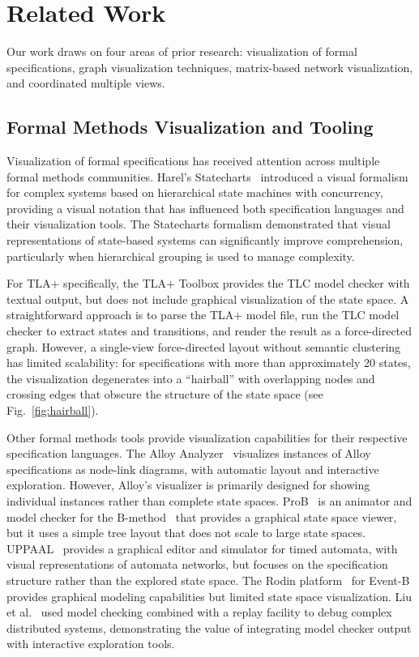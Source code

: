 \documentclass[conference]{IEEEtran}
\begin{document}
\section{Related Work}
\label{sec:related}

Our work draws on four areas of prior research: visualization of formal specifications, graph visualization techniques, matrix-based network visualization, and coordinated multiple views.

\subsection{Formal Methods Visualization and Tooling}

Visualization of formal specifications has received attention across multiple formal methods communities. Harel's Statecharts~\cite{harel1987statecharts} introduced a visual formalism for complex systems based on hierarchical state machines with concurrency, providing a visual notation that has influenced both specification languages and their visualization tools. The Statecharts formalism demonstrated that visual representations of state-based systems can significantly improve comprehension, particularly when hierarchical grouping is used to manage complexity.

For TLA+ specifically, the TLA+ Toolbox provides the TLC model checker with textual output, but does not include graphical visualization of the state space. A straightforward approach is to parse the TLA+ model file, run the TLC model checker to extract states and transitions, and render the result as a force-directed graph. However, a single-view force-directed layout without semantic clustering has limited scalability: for specifications with more than approximately 20 states, the visualization degenerates into a ``hairball'' with overlapping nodes and crossing edges that obscure the structure of the state space (see Fig.~\ref{fig:hairball}).

Other formal methods tools provide visualization capabilities for their respective specification languages. The Alloy Analyzer~\cite{jackson2012alloy} visualizes instances of Alloy specifications as node-link diagrams, with automatic layout and interactive exploration. However, Alloy's visualizer is primarily designed for showing individual instances rather than complete state spaces. ProB~\cite{leuschel2008prob} is an animator and model checker for the B-method~\cite{abrial1996bbook} that provides a graphical state space viewer, but it uses a simple tree layout that does not scale to large state spaces. UPPAAL~\cite{behrmann2004uppaal} provides a graphical editor and simulator for timed automata, with visual representations of automata networks, but focuses on the specification structure rather than the explored state space. The Rodin platform~\cite{abrial2010rodin} for Event-B provides graphical modeling capabilities but limited state space visualization. Liu et al.~\cite{liu2005model} used model checking combined with a replay facility to debug complex distributed systems, demonstrating the value of integrating model checker output with interactive exploration tools.
\end{document}
